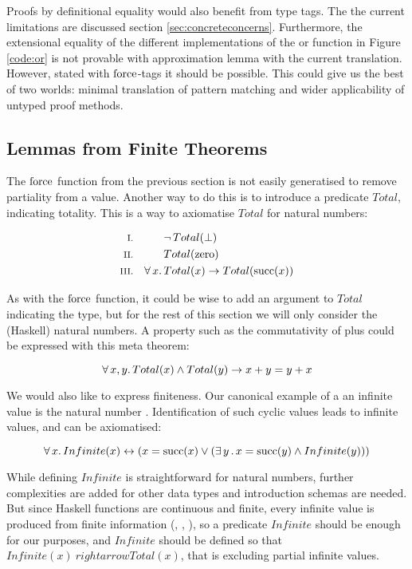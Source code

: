 Proofs by definitional equality would also benefit from type tags. The
the current limitations are discussed section
\ref{sec:concreteconcerns}. Furthermore, the extensional equality of
the different implementations of the or function in Figure
\ref{code:or} is not provable with approximation lemma with the
current translation. However, stated with $\mathrm{force}$-tags it should
be possible. This could give us the best of two worlds: minimal
translation of pattern matching and wider applicability of untyped
proof methods.

\subsection{Lemmas from Finite Theorems}

The $\mathrm{force}$ function from the previous section is not easily
generatised to remove partiality from a value. Another way to do this
is to introduce a predicate $Total$, indicating totality. This is a
way to axiomatise $Total$ for natural numbers:

\begin{align*}
\rom{1} &&        & \neg \, Total(\bot) \\
\rom{2} &&        & Total(\fn{zero}) \\
\rom{3} && \fa{x} & Total(x) \rightarrow Total(\fn{succ}(x))
\end{align*}

As with the $\mathrm{force}$ function, it could be wise to add an argument
to $Total$ indicating the type, but for the rest of this section we
will only consider the (Haskell) natural numbers. A property such as the
commutativity of plus could be expressed with this meta theorem:

\begin{equation*}
\forall \, x , y . \, Total(x) \wedge Total(y) \rightarrow x + y = y + x
\end{equation*}

We would also like to express finiteness. Our canonical example of a
an infinite value is the natural number
. Identification of such cyclic values leads to
infinite values, and can be axiomatised:

\begin{equation*}
\forall \, x . \, Infinite(x) \leftrightarrow (x = \mathrm{succ}(x) \vee (\exists \, y \, . \, x = \mathrm{succ}(y) \wedge Infinite(y))) \\
\end{equation*}

While defining $Infinite$ is straightforward for natural numbers,
further complexities are added for other data types and introduction
schemas are needed. But since Haskell functions are continuous and
finite, every infinite value is produced from finite information
(, , ), so a predicate $Infinite$
should be enough for our purposes, and $Infinite$ should be defined so
that $Infinite(x)\ rightarrow Total(x)$, that is excluding partial
infinite values.

